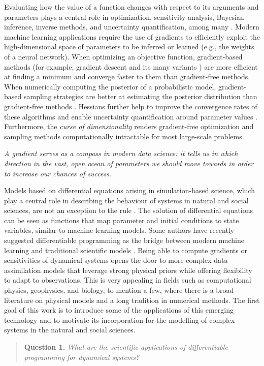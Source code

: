 Evaluating how the value of a function changes with respect to its arguments and parameters plays a central role in optimization, sensitivity analysis, Bayesian inference, inverse methods, and uncertainty quantification, among many \cite{Razavi.2021}. 
Modern machine learning applications require the use of gradients to efficiently exploit the high-dimensional space of parameters to be inferred or learned (e.g., the weights of a neural network). 
When optimizing an objective function, gradient-based methods (for example, gradient descent and its many variants \cite{ruder2016overview-gradient-descent}) are more efficient at finding a minimum and converge faster to them than gradient-free methods.
When numerically computing the posterior of a probabilistic model, gradient-based sampling strategies are better at estimating the posterior distribution than gradient-free methods \cite{neal2011mcmc}. 
Hessians further help to improve the convergence rates of these algorithms and enable uncertainty quantification around parameter values \cite{BuiThanh:2012ul}.
Furthermore, the \textit{curse of dimensionality} renders gradient-free optimization and sampling methods computationally intractable for most large-scale problems.
\begin{displayquote}
\emph{A gradient serves as a compass in modern data science: it tells us in which direction in the vast, open ocean of parameters we should move towards in order to increase our chances of success.  }
\end{displayquote}

Models based on differential equations arising in simulation-based science, which play a central role in describing the behaviour of systems in natural and social sciences, are not an exception to the rule \cite{Ghattas.2021}.
The solution of differential equations can be seen as functions that map parameter and initial conditions to state variables, similar to machine learning models.
Some authors have recently suggested differentiable programming as the bridge between modern machine learning and traditional scientific models \cite{Ramsundar_Krishnamurthy_Viswanathan_2021, Shen_diff_modelling, Gelbrecht-differential-programming-Earth, rackauckas2021generalized}. 
Being able to compute gradients or sensitivities of dynamical systems opens the door to more complex data assimilation models that leverage strong physical priors while offering flexibility to adapt to observations.
This is very appealing in fields such as computational physics, geophysics, and biology, to mention a few, where there is a broad literature on physical models and a long tradition in numerical methods. 
The first goal of this work is to introduce some of the applications of this emerging technology and to motivate its incorporation for the modelling of complex systems in the natural and social sciences. 
\begin{quote}
    \textbf{Question 1. }
    \textit{What are the scientific applications of differentiable programming for dynamical systems?}
\end{quote}

